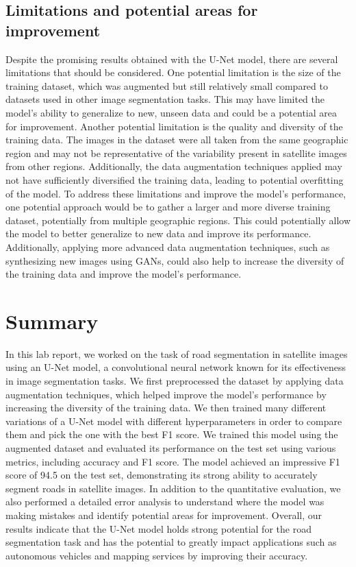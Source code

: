 \documentclass[10pt,conference,compsocconf]{IEEEtran}
\begin{document}
\subsection{Limitations and potential areas for improvement}
Despite the promising results obtained with the U-Net model, there are several limitations that should be considered. One potential limitation is the size of the training dataset, which was augmented but still relatively small compared to datasets used in other image segmentation tasks. This may have limited the model's ability to generalize to new, unseen data and could be a potential area for improvement.
\newline
Another potential limitation is the quality and diversity of the training data. The images in the dataset were all taken from the same geographic region and may not be representative of the variability present in satellite images from other regions. Additionally, the data augmentation techniques applied may not have sufficiently diversified the training data, leading to potential overfitting of the model.
\newline
To address these limitations and improve the model's performance, one potential approach would be to gather a larger and more diverse training dataset, potentially from multiple geographic regions. This could potentially allow the model to better generalize to new data and improve its performance. Additionally, applying more advanced data augmentation techniques, such as synthesizing new images using GANs, could also help to increase the diversity of the training data and improve the model's performance.
\section{Summary}
In this lab report, we worked on the task of road segmentation in satellite images using an U-Net model, a convolutional neural network known for its effectiveness in image segmentation tasks. We first preprocessed the dataset by applying data augmentation techniques, which helped improve the model's performance by increasing the diversity of the training data. We then trained many different variations of a U-Net model with different hyperparameters in order to compare them and pick the one with the best F1 score. We trained this model using the augmented dataset and evaluated its performance on the test set using various metrics, including accuracy and F1 score. The model achieved an impressive F1 score of 94.5 on the test set, demonstrating its strong ability to accurately segment roads in satellite images. In addition to the quantitative evaluation, we also performed a detailed error analysis to understand where the model was making mistakes and identify potential areas for improvement. Overall, our results indicate that the U-Net model holds strong potential for the road segmentation task and has the potential to greatly impact applications such as autonomous vehicles and mapping services by improving their accuracy.
\end{document}

